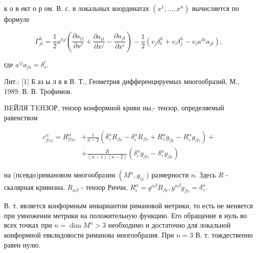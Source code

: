 \documentclass[10pt]{article}
\begin{document}
к о в ект о р ом. В. с. в локальных координатах $\left(x^{1}, \ldots, x^{n}\right)$ вычисляется по формуле



\[

\Gamma_{j t}^{h}=\frac{1}{2} a^{h j}\left(\frac{\partial a_{i j}}{\partial x^{t}}+\frac{\partial a_{i t}}{\partial x^{j}}-\frac{\partial a_{j t}}{\partial x^{i}}\right)-\frac{1}{2}\left(v_{j} \delta_{t}^{h}+v_{i} \delta_{j}^{h}-v_{i} a^{i h} a_{j t}\right),

\]



где $a^{i j} a_{j s}=\delta_{s}^{i}$.



Лит.: [1] Б аз ы л в в В. Т., Геометрия дифференцируемых многообразий, М., 1989. В. В. Трофимов.



BEЙЛЯ TEHЗОР, тензор конформной криви ны,- тензор, определяемый равенством



\[

\begin{aligned}

c_{\beta \gamma \varepsilon}^{\alpha}=R_{\beta \gamma \varepsilon}^{\alpha} & +\frac{1}{n-2}\left(\delta_{\gamma}^{\alpha} R_{\beta \varepsilon}-\delta_{\varepsilon}^{\alpha} R_{\beta \gamma}+R_{\gamma}^{\alpha} g_{\beta \varepsilon}-R_{\varepsilon}^{\alpha} g_{\beta \gamma}\right)+ \\

& +\frac{R}{(n-1)(n-2)}\left(\delta_{\varepsilon}^{\alpha} g_{\beta \gamma}-\delta_{\gamma}^{\alpha} g_{\beta \varepsilon}\right)

\end{aligned}

\]



на (псевдо)римановом многообразии $\left(M^{n}, g_{i j}\right.$ ) размерности $n$. Здесь $R$ - скалярная кривизна, $R_{\alpha \beta}$ - тензор Риччи, $R_{\varepsilon}^{\alpha}=g^{\alpha \beta} R_{\beta \varepsilon}, g^{\alpha \beta} g_{\beta \gamma}=\delta_{\gamma}^{\alpha}$.



В. т. является конформным инвариантом римановой метрики, то есть не меняется при умножении метрики на положительную функцию. Его обращение в нуль во всех точках при $n=\operatorname{dim} M^{n}>3$ необходимо и достаточно для локальной конформной евклидовости риманова многообразия. При $n=3$ В. т. тождественно равен нулю.
\end{document}

